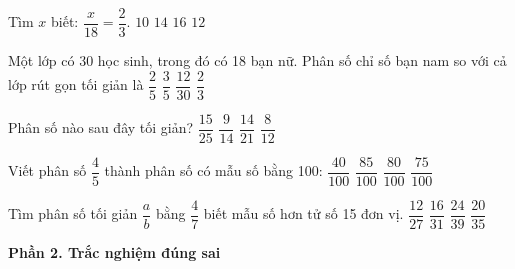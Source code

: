 \begin{ex} %
Tìm $x$ biết: $\dfrac{x}{18} = \dfrac{2}{3}$.
\choice
{$10$}
{$14$}
{$16$}
{\True $12$}
\end{ex}

\begin{ex} %
Một lớp có 30 học sinh, trong đó có 18 bạn nữ. Phân số chỉ số bạn nam so với cả lớp rút gọn tối giản là
\choice
{\True $\dfrac{2}{5}$}
{$\dfrac{3}{5}$}
{$\dfrac{12}{30}$}
{$\dfrac{2}{3}$}
\end{ex}

\begin{ex} %
Phân số nào sau đây tối giản?
\choice
{$\dfrac{15}{25}$}
{\True $\dfrac{9}{14}$}
{$\dfrac{14}{21}$}
{$\dfrac{8}{12}$}
\end{ex}

\begin{ex} %
Viết phân số $\dfrac{4}{5}$ thành phân số có mẫu số bằng 100:
\choice
{$\dfrac{40}{100}$}
{$\dfrac{85}{100}$}
{\True $\dfrac{80}{100}$}
{$\dfrac{75}{100}$}
\end{ex}

\begin{ex} %
Tìm phân số tối giản $\dfrac{a}{b}$ bằng $\dfrac{4}{7}$ biết mẫu số hơn tử số 15 đơn vị.
\choice
{$\dfrac{12}{27}$}
{$\dfrac{16}{31}$}
{$\dfrac{24}{39}$}
{\True $\dfrac{20}{35}$}
\end{ex}

\textbf{Phần 2. Trắc nghiệm đúng sai}

